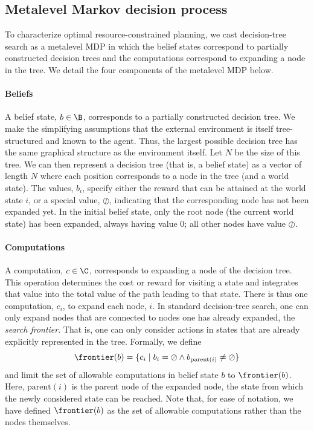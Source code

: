 \subsection{Metalevel Markov decision process}

To characterize optimal resource-constrained planning, we cast decision-tree search as a metalevel MDP in which the belief states correspond to partially constructed decision trees and the computations correspond to expanding a node in the tree. We detail the four components of the metalevel MDP below.

\paragraph{Beliefs}

A belief state, $b \in \B$, corresponds to a partially constructed decision tree. We make the simplifying assumptions that the external environment is itself tree-structured and known to the agent. Thus, the largest possible decision tree has the same graphical structure as the environment itself. Let $N$ be the size of this tree. We can then represent a decision tree (that is, a belief state) as a vector of length $N$ where each position corresponds to a node in the tree (and a world state). The values, $b_i$, specify either the reward that can be attained at the world state $i$, or a special value, $\oslash$, indicating that the corresponding node has not been expanded yet. In the initial belief state, only the root node (the current world state) has been expanded, always having value 0; all other nodes have value $\oslash$.

\paragraph{Computations}

A computation, $c \in \C$, corresponds to expanding a node of the decision tree. This operation determines the cost or reward for visiting a state and integrates that value into the total value of the path leading to that state. There is thus one computation, $c_i$, to expand each node, $i$. In standard decision-tree search, one can only expand nodes that are connected to nodes one has already expanded, the \emph{search frontier}. That is, one can only consider actions in states that are already explicitly represented in the tree. Formally, we define
\begin{equation}
\frontier(b) = \{c_i \mid b_i = \oslash \wedge b_{\mathrm{parent}(i)} \neq \oslash \}
\end{equation}
and limit the set of allowable computations in belief state $b$ to $\frontier(b)$. Here, $\mathrm{parent}(i)$ is the parent node of the expanded node, the state from which the newly considered state can be reached. Note that, for ease of notation, we have defined $\frontier(b)$ as the set of allowable computations rather than the nodes themselves.

